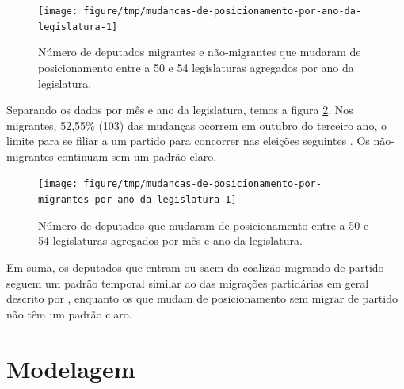 \documentclass[a4paper,titlepage]{ppgi}\usepackage[]{graphicx}\usepackage[]{color}
\newenvironment{knitrout}{}{} %
\begin{document}
\begin{knitrout}
\color{fgcolor}\begin{figure}
\texttt{[image: figure/tmp/mudancas-de-posicionamento-por-ano-da-legislatura-1]} \caption[Número de deputados migrantes e não-migrantes que mudaram de posicionamento entre a 50\textordfeminine{} e 54\textordfeminine{} legislaturas agregados por ano da legislatura]{Número de deputados migrantes e não-migrantes que mudaram de posicionamento entre a 50\textordfeminine{} e 54\textordfeminine{} legislaturas agregados por ano da legislatura.}\label{fig:mudancas-de-posicionamento-por-ano-da-legislatura}
\end{figure}


\end{knitrout}

Separando os dados por mês e ano da legislatura, temos a figura
\ref{fig:mudancas-de-posicionamento-por-migrantes-por-ano-da-legislatura}. Nos
migrantes,
52,55\%
(103) das mudanças ocorrem
em outubro do terceiro ano, o limite para se filiar a um partido para concorrer
nas eleições seguintes \cite{Lei9504/1997}. Os não-migrantes continuam sem um
padrão claro.

\begin{knitrout}
\color{fgcolor}\begin{figure}
\texttt{[image: figure/tmp/mudancas-de-posicionamento-por-migrantes-por-ano-da-legislatura-1]} \caption[Número de deputados que mudaram de posicionamento entre a 50\textordfeminine{} e 54\textordfeminine{} legislaturas agregados por mês e ano da legislatura]{Número de deputados que mudaram de posicionamento entre a 50\textordfeminine{} e 54\textordfeminine{} legislaturas agregados por mês e ano da legislatura.}\label{fig:mudancas-de-posicionamento-por-migrantes-por-ano-da-legislatura}
\end{figure}


\end{knitrout}

Em suma, os deputados que entram ou saem da coalizão migrando de partido
seguem um padrão temporal similar ao das migrações partidárias em geral
descrito por , enquanto os que mudam de posicionamento
sem migrar de partido não têm um padrão claro.

\section{Modelagem}
\end{document}

